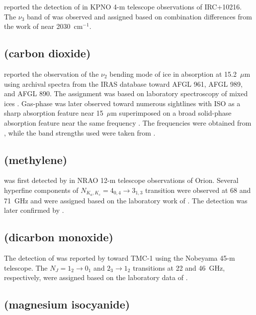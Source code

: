 \documentclass[twocolumn]{aastex631}
\begin{document}
	\citet{Hinkle:1988yc} reported the detection of  in KPNO 4-m telescope observations of IRC+10216.  The $\nu_3$ band of  was observed and assigned based on combination differences from the work of \citet{Gausset:1965ea} near 2030~cm$^{-1}$.  
	
	\subsection{ (carbon dioxide)}
	\label{CO2}
	
	\citet{deHendecourt:1989iu} reported the observation of the $\nu_2$ bending mode of  ice in absorption at 15.2~$\mu$m using archival spectra from the IRAS database toward AFGL 961, AFGL 989, and AFGL 890.  The assignment was based on laboratory spectroscopy of mixed  ices \citep{dHendecourt:1986wx}. Gas-phase  was later observed toward numerous sightlines with ISO as a sharp absorption feature near 15~$\mu$m superimposed on a broad solid-phase absorption feature near the same frequency \citep{vanDischoeck:1996nd}.  The frequencies were obtained from \citet{Paso:1980ec}, while the band strengths used were taken from \citet{ReichleJr:1972hg}.
	
	\subsection{ (methylene)}
	\label{CH2}
	
	 was first detected by \citet{Hollis:1989nh} in NRAO 12-m telescope observations of Orion.  Several hyperfine components of $N_{K_a,K_c} = 4_{0,4}\rightarrow3_{1,3}$ transition were observed at 68 and 71~GHz and were assigned based on the laboratory work of \citet{Lovas:1983cp}.  The detection was later confirmed by \citet{Hollis:1995ng}.
	
	\subsection{ (dicarbon monoxide)}
	\label{C2O}
	
	The detection of  was reported by \citet{Ohishi:1991yt} toward TMC-1 using the Nobeyama 45-m telescope.  The $N_J = 1_2\rightarrow0_1$ and $2_3\rightarrow1_2$ transitions at 22 and 46~GHz, respectively, were assigned based on the laboratory data of \citet{Yamada:1985re}.
	
	\subsection{ (magnesium isocyanide)}
	\label{MgNC}
	
\end{document}
